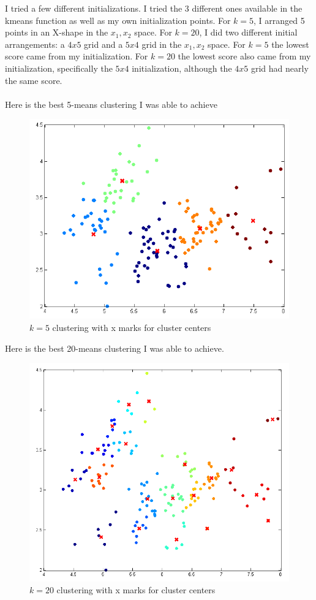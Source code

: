 \documentclass[twoside,11pt]{article}
\theoremstyle{definition}
\begin{document}
I tried a few different initializations. I tried the 3 different ones available in the kmeans function as well as my own initialization points. For $k=5$, I arranged 5 points in an X-shape in the $x_1,x_2$ space. For $k=20$, I did two different initial arrangements: a $4x5$ grid and a $5x4$ grid in the $x_1,x_2$ space. For $k=5$ the lowest score came from my initialization. For $k=20$ the lowest score also came from my initialization, specifically the $5x4$ initialization, although the $4x5$ grid had nearly the same score. \\
\\
Here is the best 5-means clustering I was able to achieve
\begin{figure}[h]
\centering
\includegraphics[width=6 in]{prob1PartB_1.png}
\caption{$k=5$ clustering with x marks for cluster centers}
\end{figure}

\newpage

Here is the best 20-means clustering I was able to achieve.
\begin{figure}[h]
\centering
\includegraphics[width=6 in]{prob1PartB_2.png}
\caption{$k=20$ clustering with x marks for cluster centers}
\end{figure}
\end{document}
